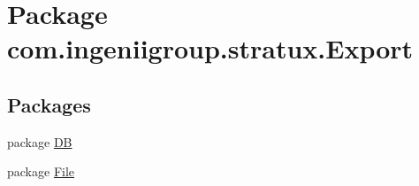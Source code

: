 \hypertarget{namespacecom_1_1ingeniigroup_1_1stratux_1_1_export}{}\section{Package com.\+ingeniigroup.\+stratux.\+Export}
\label{namespacecom_1_1ingeniigroup_1_1stratux_1_1_export}
\subsection*{Packages}
\begin{DoxyCompactItemize}
\item 
package \hyperlink{namespacecom_1_1ingeniigroup_1_1stratux_1_1_export_1_1_d_b}{DB}
\item 
package \hyperlink{namespacecom_1_1ingeniigroup_1_1stratux_1_1_export_1_1_file}{File}
\end{DoxyCompactItemize}

